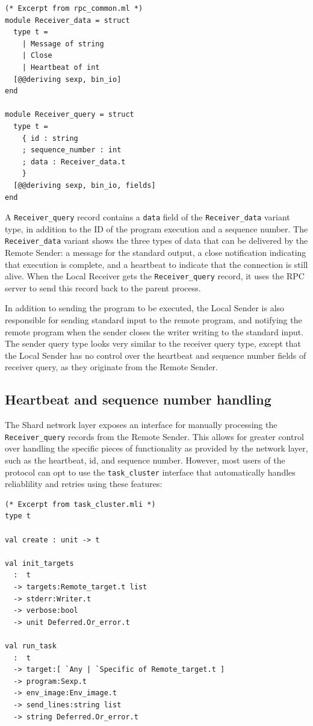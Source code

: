 \documentclass[twoside]{report}
\begin{document}
\begin{minipage}[c]{\textwidth-15pt}
  \begin{lstlisting}
(* Excerpt from rpc_common.ml *)
module Receiver_data = struct
  type t =
    | Message of string
    | Close
    | Heartbeat of int
  [@@deriving sexp, bin_io]
end

module Receiver_query = struct
  type t =
    { id : string
    ; sequence_number : int
    ; data : Receiver_data.t
    }
  [@@deriving sexp, bin_io, fields]
end
\end{lstlisting}
  \smallskip
\end{minipage}

A \texttt{Receiver\_query} record contains a \texttt{data} field of the \texttt{Receiver\_data} variant type, in addition to the ID of the program execution and a sequence number.
The \texttt{Receiver\_data} variant shows the three types of data that can be delivered by the Remote Sender: a message for the standard output, a close notification indicating that execution is complete, and a heartbeat to indicate that the connection is still alive.
When the Local Receiver gets the \texttt{Receiver\_query} record, it uses the RPC server to send this record back to the parent process.

In addition to sending the program to be executed, the Local Sender is also responsible for sending standard input to the remote program, and notifying the remote program when the sender closes the writer writing to the standard input.
The sender query type looks very similar to the receiver query type, except that the Local Sender has no control over the heartbeat and sequence number fields of receiver query, as they originate from the Remote Sender.

\subsection{Heartbeat and sequence number handling}
The Shard network layer exposes an interface for manually processing the \texttt{Receiver\_query} records from the Remote Sender.
This allows for greater control over handling the specific pieces of functionality as provided by the network layer, such as the heartbeat, id, and sequence number. However, most users of the protocol can opt to use the \texttt{task\_cluster} interface that automatically handles reliablility and retries using these features:

\begin{minipage}[c]{\textwidth-15pt}
  \begin{lstlisting}
(* Excerpt from task_cluster.mli *)
type t

val create : unit -> t

val init_targets
  :  t
  -> targets:Remote_target.t list
  -> stderr:Writer.t
  -> verbose:bool
  -> unit Deferred.Or_error.t

val run_task
  :  t
  -> target:[ `Any | `Specific of Remote_target.t ]
  -> program:Sexp.t
  -> env_image:Env_image.t
  -> send_lines:string list
  -> string Deferred.Or_error.t
\end{lstlisting}
  \smallskip
\end{minipage}
\end{document}
